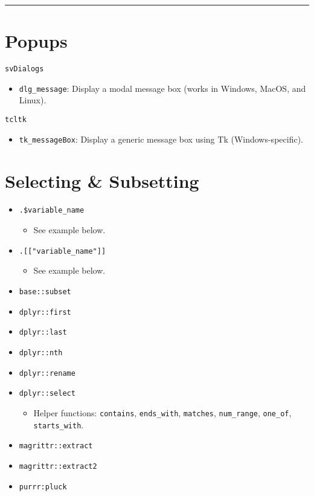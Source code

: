 \documentclass[
]{book}
\providecommand{\tightlist}{%
  \setlength{\itemsep}{0pt}\setlength{\parskip}{0pt}}
\begin{document}
\begin{center}\rule{0.5\linewidth}{0.5pt}\end{center}

\hypertarget{popups}{%
\section{Popups}\label{popups}}

\texttt{svDialogs}

\begin{itemize}
\tightlist
\item
  \texttt{dlg\_message}: Display a modal message box (works in Windows, MacOS, and Linux).
\end{itemize}

\texttt{tcltk}

\begin{itemize}
\tightlist
\item
  \texttt{tk\_messageBox}: Display a generic message box using Tk (Windows-specific).
\end{itemize}

\hypertarget{selecting-subsetting}{%
\section{Selecting \& Subsetting}\label{selecting-subsetting}}

\begin{itemize}
\tightlist
\item
  \texttt{.\$variable\_name}

  \begin{itemize}
  \tightlist
  \item
    See example below.
  \end{itemize}
\item
  \texttt{.{[}{[}"variable\_name"{]}{]}}

  \begin{itemize}
  \tightlist
  \item
    See example below.
  \end{itemize}
\item
  \texttt{base::subset}
\item
  \texttt{dplyr::first}
\item
  \texttt{dplyr::last}
\item
  \texttt{dplyr::nth}
\item
  \texttt{dplyr::rename}
\item
  \texttt{dplyr::select}

  \begin{itemize}
  \tightlist
  \item
    Helper functions: \texttt{contains}, \texttt{ends\_with}, \texttt{matches}, \texttt{num\_range}, \texttt{one\_of}, \texttt{starts\_with}.
  \end{itemize}
\item
  \texttt{magrittr::extract}
\item
  \texttt{magrittr::extract2}
\item
  \texttt{purrr:pluck}
\end{itemize}
\end{document}
